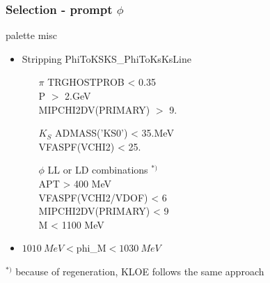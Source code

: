 \documentclass{beamer}
\begin{document}
\LogoOff
\begin{frame}[fragile]
\frametitle{Selection - prompt $\phi$}

\begin{beamercolorbox}[rounded=true,shadow=true]{palette misc}
\begin{itemize}
\item Stripping PhiToKSKS\_PhiToKsKsLine
\begin{itemize}
\item[$\pi$] 
TRGHOSTPROB < 0.35\\
P $>$ 2.GeV\\
MIPCHI2DV(PRIMARY) $>$ 9.\\
\item[$K_S$]ADMASS('KS0') < 35.MeV\\
VFASPF(VCHI2) < 25.\\
\item[$\phi$]LL or LD combinations $^{*)}$\\
APT > 400 MeV\\
VFASPF(VCHI2/VDOF) < 6\\
MIPCHI2DV(PRIMARY) < 9\\
M < 1100 MeV\\
\end{itemize}
\item $\SI{1010}{MeV}<$phi\_M$<\SI{1030}{MeV}$
\end{itemize}
\end{beamercolorbox}
$^{*)}$ because of regeneration, KLOE follows the same approach



\end{frame}
\LogoOn
\end{document}
